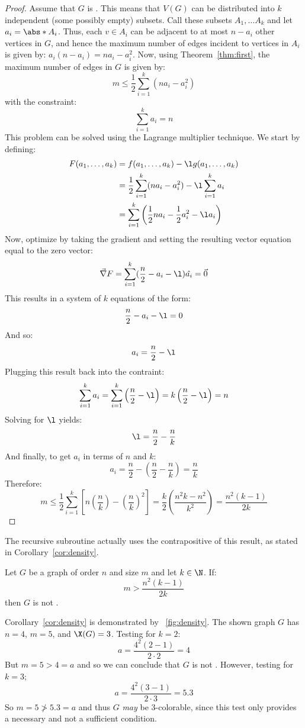 \begin{proof}
  Assume that \(G\) is .  This means that \(V(G)\) can be distributed into \(k\) independent (some
  possibly empty) subsets.  Call these subsets \(A_1,\ldots A_k\) and let \(a_i=\abs*{A_i}\).  Thus, each \(v\in
  A_i\) can be adjacent to at most \(n-a_i\) other vertices in \(G\), and hence the maximum number of edges
  incident to vertices in \(A_i\) is given by: \(a_i(n-a_i)=na_i-a_i^2\).  Now, using Theorem~\ref{thm:first}, the
  maximum number of edges in \(G\) is given by:
  \[m\le\frac{1}{2}\sum_{i=1}^k(na_i-a_i^2)\]
  with the constraint:
  \[\sum_{i=1}^ka_i=n\]
  This problem can be solved using the Lagrange multiplier technique.  We start by defining:
  \begin{align*}
    F(a_1,\ldots,a_k) &= f(a_1,\ldots,a_k)-\l g(a_1,\ldots,a_k) \\
    &= \frac{1}{2}\sum_{i=1}^k(na_i-a_i^2)-\l\sum_{i=1}^ka_i \\
    &= \sum_{i=1}^k\left(\frac{1}{2}na_i-\frac{1}{2}a_i^2-\l a_i\right)
  \end{align*}
  Now, optimize by taking the gradient and setting the resulting vector equation equal to the zero vector:
  \[\vec{\nabla}F=\sum_{i=1}^k(\frac{n}{2}-a_i-\l)\hat{a_i}=\vec{0}\]
  This results in a system of \(k\) equations of the form:
  \[\frac{n}{2}-a_i-\l=0\]
  And so:
  \[a_i=\frac{n}{2}-\l\]
  Plugging this result back into the contraint:
  \[\sum_{i=1}^ka_i=\sum_{i=1}^k\left(\frac{n}{2}-\l\right)=k\left(\frac{n}{2}-\l\right)=n\]
  Solving for \(\l\) yields:
  \[\l=\frac{n}{2}-\frac{n}{k}\]
  And finally, to get \(a_i\) in terms of \(n\) and \(k\):
  \[a_i=\frac{n}{2}-\left(\frac{n}{2}-\frac{n}{k}\right)=\frac{n}{k}\]
  Therefore:
  \[m\le\frac{1}{2}\sum_{i=1}^k\left[n\left(\frac{n}{k}\right)-\left(\frac{n}{k}\right)^2\right]=
  \frac{k}{2}\left(\frac{n^2k-n^2}{k^2}\right)=\frac{n^2(k-1)}{2k}\]
\end{proof}

The recursive subroutine actually uses the contrapositive of this result, as stated in Corollary~\ref{cor:density}.

\begin{corollary}
  \label{cor:density}
  Let \(G\) be a graph of order \(n\) and size \(m\) and let \(k\in\N\).  If:
  \[m>\frac{n^2(k-1)}{2k}\]
  then \(G\) is not .
\end{corollary}

Corollary~\ref{cor:density} is demonstrated by \figurename~\ref{fig:density}.  The shown graph \(G\) has \(n=4\),
\(m=5\), and \(\X(G)=3\).  Testing for \(k=2\):
\[a=\frac{4^2(2-1)}{2\cdot2}=4\]
But \(m=5>4=a\) and so we can conclude that \(G\) is not .  However, testing for \(k=3\);
\[a=\frac{4^2(3-1)}{2\cdot3}=5.3\]
So \(m=5\ngtr5.3=a\) and thus \(G\) \emph{may} be \(3\)-colorable, since this test only provides a necessary and
not a sufficient condition.

